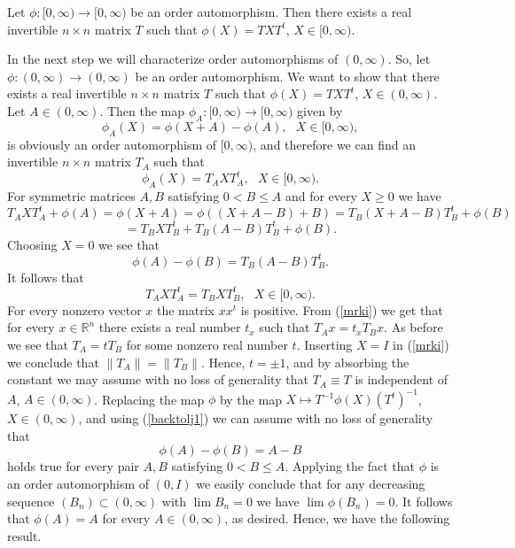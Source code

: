 \documentclass{article}
\begin{document}
\begin{theorem}
Let $\phi : [0, \infty ) \to [0, \infty)$ be an order automorphism. Then there exists a real invertible $n \times n$ matrix $T$ such that $\phi (X) = TXT^t$, $X \in [0, \infty)$.
\end{theorem}

In the next step we will characterize order automorphisms of $(0, \infty)$. So, let $\phi : (0, \infty ) \to (0, \infty)$ be an order automorphism. We want to show that there exists a real invertible $n \times n$ matrix $T$ such that $\phi (X) = TXT^t$, $X \in (0, \infty)$. Let $A \in (0 , \infty)$. Then the map $\phi_A : [0, \infty) \to [0 , \infty)$ given by
$$
\phi_A (X) = \phi ( X + A) - \phi (A), \ \ \  X \in [0, \infty),
$$
is obviously an order automorphism of $[0, \infty)$, and therefore we can find an invertible $n \times n$ matrix $T_A$ such that
$$
\phi_A (X) = T_A X T_{A}^t , \ \ \  X \in [0, \infty).
$$
For symmetric matrices $A,B$ satisfying $0 < B \le A$ and for every $X \ge 0$ we have
$$
T_A X T_{A}^t + \phi (A) = \phi (X+A) = \phi ((X + A-B) + B) = T_B (X + A - B)T_{B}^t + \phi (B) $$ $$=   T_B X T_{B}^t +  T_B (A - B)T_{B}^t + \phi (B).
$$
Choosing $X=0$ we see that
\begin{equation}\label{backtolj1}
\phi (A) - \phi (B) =   T_B (A - B)T_{B}^t.
\end{equation}
It follows that 
\begin{equation}\label{mrki}
T_A X T_{A}^t  = T_B X T_{B}^t , \ \ \ X \in [0, \infty).
\end{equation}
 For every nonzero vector $x$ the matrix $xx^t$ is positive. From (\ref{mrki}) we get that for every $x \in \mathbb{R}^n$ there exists a real number $t_x$ such that  $T_A x = t_x T_B x$. As before we see that $T_A = t T_B$ for some nonzero real number $t$. Inserting $X = I$ in (\ref{mrki}) we conclude that $\| T_A \| = \| T_B \|$. Hence, $t= \pm 1$, and by absorbing the constant we may assume with no loss of generality that $T_A \equiv T$ is independent of $A$, $A \in (0, \infty)$. Replacing the map $\phi$ by the map $X \mapsto T^{-1} \phi (X) (T^t)^{-1}$, $X \in (0, \infty)$, and using 
(\ref{backtolj1}) we can  assume with no loss of generality that 
$$
\phi (A) - \phi (B) = A-B 
$$
holds true for every pair  $A,B$ satisfying $0 < B \le A$. Applying the fact that $\phi$ is an order automorphism of $(0,I)$ we easily conclude that for any decreasing sequence $(B_n) \subset ( 0, \infty)$ with $\lim B_n = 0$ we have $\lim \phi (B_n) =0$. It follows that $\phi (A) = A$ for every $A \in (0, \infty)$, as desired. Hence, we have the following result.
\end{document}

